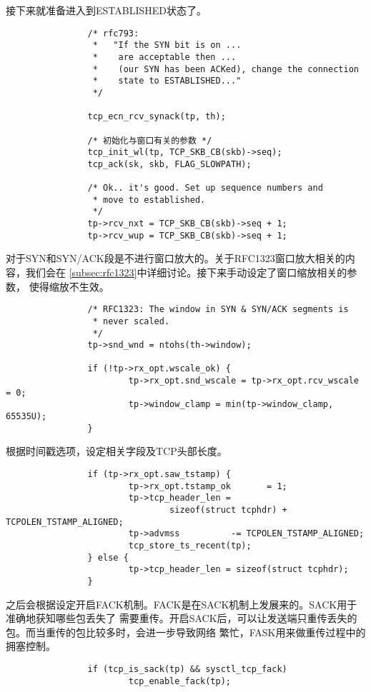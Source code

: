 接下来就准备进入到ESTABLISHED状态了。
\begin{verbatim}
                /* rfc793:
                 *   "If the SYN bit is on ...
                 *    are acceptable then ...
                 *    (our SYN has been ACKed), change the connection
                 *    state to ESTABLISHED..."
                 */

                tcp_ecn_rcv_synack(tp, th);

                /* 初始化与窗口有关的参数 */
                tcp_init_wl(tp, TCP_SKB_CB(skb)->seq);
                tcp_ack(sk, skb, FLAG_SLOWPATH);

                /* Ok.. it's good. Set up sequence numbers and
                 * move to established.
                 */
                tp->rcv_nxt = TCP_SKB_CB(skb)->seq + 1;
                tp->rcv_wup = TCP_SKB_CB(skb)->seq + 1;
\end{verbatim}
对于SYN和SYN/ACK段是不进行窗口放大的。关于RFC1323窗口放大相关的内容，我们会在
\ref{subsec:rfc1323}中详细讨论。接下来手动设定了窗口缩放相关的参数，
使得缩放不生效。
\begin{verbatim}
                /* RFC1323: The window in SYN & SYN/ACK segments is
                 * never scaled.
                 */
                tp->snd_wnd = ntohs(th->window);

                if (!tp->rx_opt.wscale_ok) {
                        tp->rx_opt.snd_wscale = tp->rx_opt.rcv_wscale = 0;
                        tp->window_clamp = min(tp->window_clamp, 65535U);
                }
\end{verbatim}
根据时间戳选项，设定相关字段及TCP头部长度。
\begin{verbatim}
                if (tp->rx_opt.saw_tstamp) {
                        tp->rx_opt.tstamp_ok       = 1;
                        tp->tcp_header_len =
                                sizeof(struct tcphdr) + TCPOLEN_TSTAMP_ALIGNED;
                        tp->advmss          -= TCPOLEN_TSTAMP_ALIGNED;
                        tcp_store_ts_recent(tp);
                } else {
                        tp->tcp_header_len = sizeof(struct tcphdr);
                }
\end{verbatim}
之后会根据设定开启FACK机制。FACK是在SACK机制上发展来的。SACK用于准确地获知哪些包丢失了
需要重传。开启SACK后，可以让发送端只重传丢失的包。而当重传的包比较多时，会进一步导致网络
繁忙，FASK用来做重传过程中的拥塞控制。
\begin{verbatim}
                if (tcp_is_sack(tp) && sysctl_tcp_fack)
                        tcp_enable_fack(tp);
\end{verbatim}
